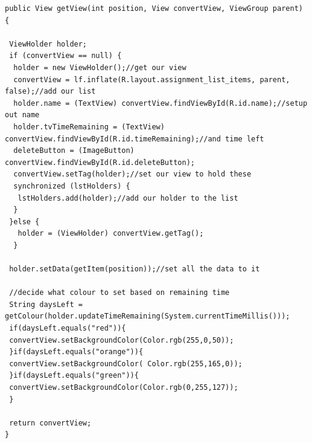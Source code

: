 \begin{verbatim}
public View getView(int position, View convertView, ViewGroup parent) {
 
 ViewHolder holder;
 if (convertView == null) {
  holder = new ViewHolder();//get our view
  convertView = lf.inflate(R.layout.assignment_list_items, parent, false);//add our list
  holder.name = (TextView) convertView.findViewById(R.id.name);//setup out name
  holder.tvTimeRemaining = (TextView) convertView.findViewById(R.id.timeRemaining);//and time left
  deleteButton = (ImageButton) convertView.findViewById(R.id.deleteButton);
  convertView.setTag(holder);//set our view to hold these
  synchronized (lstHolders) {
   lstHolders.add(holder);//add our holder to the list
  }
 }else {
   holder = (ViewHolder) convertView.getTag();
  }
 
 holder.setData(getItem(position));//set all the data to it
 
 //decide what colour to set based on remaining time
 String daysLeft = getColour(holder.updateTimeRemaining(System.currentTimeMillis()));
 if(daysLeft.equals("red")){
 convertView.setBackgroundColor(Color.rgb(255,0,50));
 }if(daysLeft.equals("orange")){
 convertView.setBackgroundColor( Color.rgb(255,165,0));
 }if(daysLeft.equals("green")){
 convertView.setBackgroundColor(Color.rgb(0,255,127));
 }
 
 return convertView;
}
\end{verbatim}

